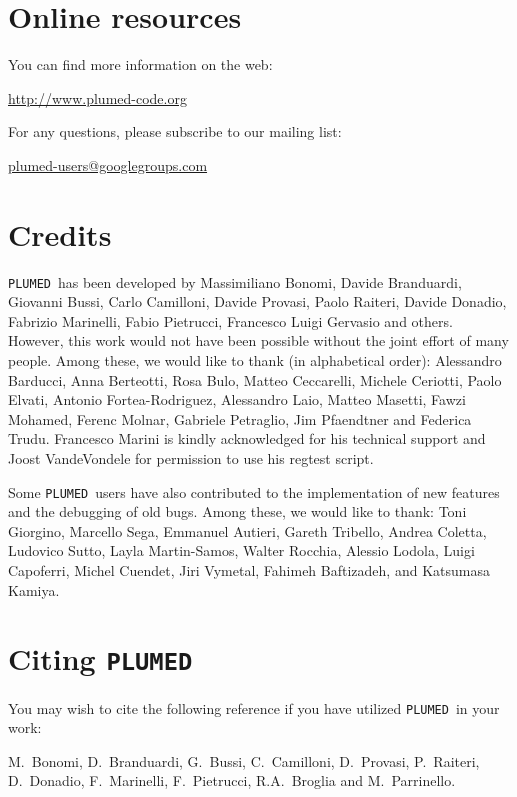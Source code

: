 \documentclass[12pt,fleqn]{report}
\newcommand{\plumed}{{\tt PLUMED}}
\begin{document}
\section{Online resources}
\label{sec.online}
You can find more information on the web: 

\begin{center}
\url{http://www.plumed-code.org}
\end{center}
For any questions, please subscribe to our mailing list:

\begin{center}
\href{mailto:plumed-users@googlegroups.com}{plumed-users@googlegroups.com}
\end{center}

\section{Credits}
\plumed \ has been developed  by 
Massimiliano Bonomi, Davide Branduardi, Giovanni Bussi, Carlo Camilloni, 
Davide Provasi, Paolo Raiteri,
Davide Donadio, Fabrizio Marinelli, Fabio Pietrucci, 
 Francesco Luigi Gervasio and others.
However, this work would not have been possible without the joint effort of many people. 
Among these, we would like to thank (in alphabetical order):
Alessandro Barducci, Anna Berteotti, Rosa Bulo, Matteo Ceccarelli, Michele Ceriotti, Paolo Elvati,  Antonio Fortea-Rodriguez, 
Alessandro Laio, Matteo Masetti, Fawzi Mohamed, Ferenc Molnar, Gabriele Petraglio, Jim Pfaendtner and Federica Trudu. 
Francesco Marini is kindly acknowledged for his technical support and Joost
VandeVondele for  permission to use his regtest script.

Some \plumed \ users have also contributed to the implementation
of new features and the debugging of old bugs. Among these, we would like to thank:
Toni Giorgino, Marcello Sega, Emmanuel Autieri, Gareth Tribello, Andrea Coletta, Ludovico Sutto, Layla Martin-Samos,
Walter Rocchia, Alessio Lodola, Luigi Capoferri, Michel Cuendet, Jiri Vymetal, Fahimeh Baftizadeh, and Katsumasa Kamiya.

\section{Citing \plumed}
\label{sec.citing}
You may wish to cite the following reference if you have utilized \plumed \ in your work:

M.~Bonomi, D.~Branduardi, G.~Bussi, C.~Camilloni, D.~Provasi, P.~Raiteri, 
D.~Donadio, F.~Marinelli, F.~Pietrucci, R.A.~Broglia and M.~Parrinello.
\end{document}
